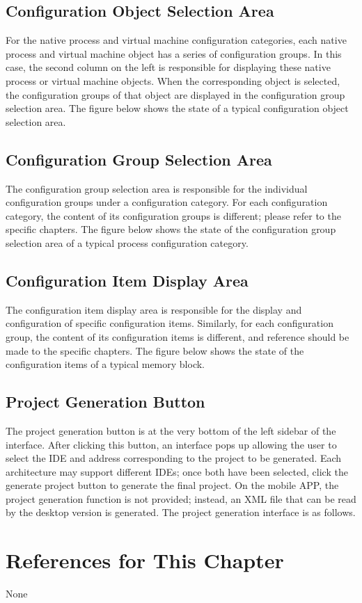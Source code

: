 \subsection{Configuration Object Selection Area}\label{subsec:5-7-3}

For the native process and virtual machine configuration categories, each native process and virtual machine object has a series of configuration groups. In this case, the second column on the left is responsible for displaying these native process or virtual machine objects. When the corresponding object is selected, the configuration groups of that object are displayed in the configuration group selection area. The figure below shows the state of a typical configuration object selection area.

\subsection{Configuration Group Selection Area}\label{subsec:5-7-4}

The configuration group selection area is responsible for the individual configuration groups under a configuration category. For each configuration category, the content of its configuration groups is different; please refer to the specific chapters. The figure below shows the state of the configuration group selection area of a typical process configuration category.

\subsection{Configuration Item Display Area}\label{subsec:5-7-5}

The configuration item display area is responsible for the display and configuration of specific configuration items. Similarly, for each configuration group, the content of its configuration items is different, and reference should be made to the specific chapters. The figure below shows the state of the configuration items of a typical memory block.

\subsection{Project Generation Button}\label{subsec:5-7-6}

The project generation button is at the very bottom of the left sidebar of the interface. After clicking this button, an interface pops up allowing the user to select the IDE and address corresponding to the project to be generated. Each architecture may support different IDEs; once both have been selected, click the generate project button to generate the final project. On the mobile APP, the project generation function is not provided; instead, an XML file that can be read by the desktop version is generated. The project generation interface is as follows.


\section{References for This Chapter}\label{sec:5-8}

None

